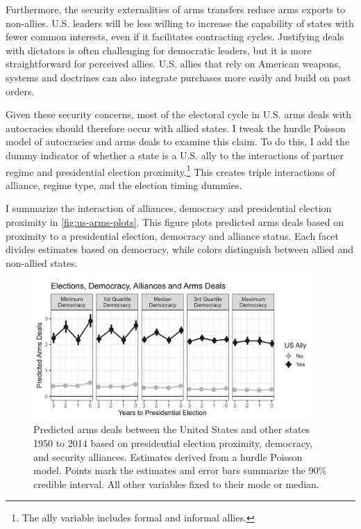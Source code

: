 \documentclass[12pt]{article}
\begin{document}
Furthermore, the security externalities of arms transfers reduce arms exports to non-allies. 
U.S. leaders will be less willing to increase the capability of states with fewer common interests, even if it facilitates contracting cycles.
Justifying deals with dictators is often challenging for democratic leaders, but it is more straightforward for perceived allies. 
U.S. allies that rely on American weapons, systems and doctrines can also integrate purchases more easily and build on past orders. 



Given these security concerns, most of the electoral cycle in U.S. arms deals with autocracies should therefore occur with allied states. 
I tweak the hurdle Poisson model of autocracies and arms deals to examine this claim. 
To do this, I add the dummy indicator of whether a state is a U.S. ally to the interactions of partner regime and presidential election proximity.\footnote{The ally variable includes formal and informal allies.}
This creates triple interactions of alliance, regime type, and the election timing dummies. 


I summarize the interaction of alliances, democracy and presidential election proximity in \autoref{fig:us-arms-plots}.
This figure plots predicted arms deals based on proximity to a presidential election, democracy and alliance status. 
Each facet divides estimates based on democracy, while colors distinguish between allied and non-allied states. 


\begin{figure}[htpb]
	\centering
		\includegraphics[width=0.95\textwidth]{../figures/us-arms-plots.png}
	\caption{Predicted arms deals between the United States and other states 1950 to 2014 based on presidential election proximity, democracy, and security alliances. Estimates derived from a hurdle Poisson model. Points mark the estimates and error bars summarize the 90\% credible interval. All other variables fixed to their mode or median.}
	\label{fig:us-arms-plots}
\end{figure}
\end{document}
